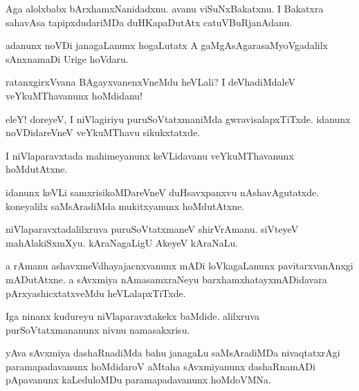 \documentclass{article}
\begin{document}
\begin{mn}%
Aga alolxbabx bArxhamxNanidadxnu. avanu viSuNxBakatxnu. I Bakatxra sahavAsa 
tapipxdudariMDa duHKapaDutAtx catuVBuRjanAdanu.
\end{mn}

\begin{mn}%
adanunx noVDi janagaLanunx hogaLutatx A gaMgAsAgarasaMyoVgadalilx sAnxnamaDi Urige hoVdaru.
\end{mn}

\begin{mn}%
ratanxgirxVvana BAgayxvanenxVneMdu heVLali? I deVhadiMdaleV veYkuMThavanunx hoMdidanu!
\end{mn}

\begin{mn}%
eleY! doreyeV, I niVlagiriyu puruSoVtatxmaniMda gwravisalapxTiTxde. idanunx noVDidareVneV 
veYkuMThavu sikukxtatxde.
\end{mn}

\begin{mn}%
I niVlaparavxtada mahimeyanunx keVLidavanu veYkuMThavanunx hoMdutAtxne.
\end{mn}

\begin{mn}%
idanunx keVLi samxrisikoMDareVneV duHsavxpanxvu nAshavAgutatxde. koneyalilx saMsAradiMda 
mukitxyanunx hoMdutAtxne.
\end{mn}

\begin{mn}%
niVlaparavxtadalilxruva  puruSoVtatxmaneV shirVrAmanu. siVteyeV mahAlakiSxmXyu. 
kAraNagaLigU AkeyeV kAraNaLu.
\end{mn}

\begin{mn}%
a rAmanu ashavxmeVdhayajacnxvanunx mADi loVkagaLanunx pavitarxvanAnxgi mADutAtxne. a 
sAvxmiya nAmasamxraNeyu barxhamxhatayxmADidavara pArxyashicxtatxveMdu heVLalapxTiTxde.
\end{mn}

\begin{mn}%
Iga ninanx kudureyu niVlaparavxtakekx baMdide. alilxruva purSoVtatxmananunx nivnu 
namasakxrisu.
\end{mn}

\begin{mn}%
yAva sAvxmiya dashaRnadiMda bahu janagaLu saMsAradiMDa nivaqtatxrAgi paramapadavanunx 
hoMdidaroV aMtaha sAvxmiyanunx dashaRnamADi pApavanunx kaLeduloMDu paramapadavanunx 
hoMdoVMNa.
\end{mn}
\end{document}
